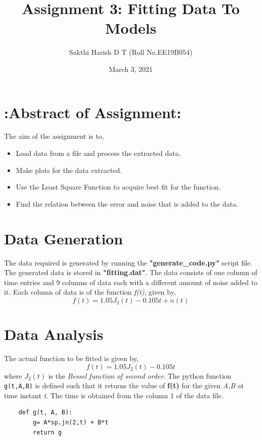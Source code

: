 \documentclass[11pt, a4paper]{article}
\title{Assignment 3: Fitting Data To Models}
\author{Sakthi Harish D T (Roll No.EE19B054)}
\date{March 3, 2021}
\begin{document}

\section*{\hspace{30 mm}:Abstract of Assignment:}
The aim of the assignment is to,
\begin{itemize}
    \item Load data from a file and process the extracted data.
    \item Make plots for the data extracted.
    \item Use the Least Square Function to acquire best fit for the function.
    \item Find the relation between the error and noise that is added to the data.
\end{itemize}

\section{Data Generation}
The data required is generated by running the \textbf{"generate\_code.py"} script file. The generated data is stored in \textbf{"fitting.dat"}. The data consists of one column of time entries and 9 columns of data each with a different amount of noise added to it. Each column of data is of the function \textit{f(t)}, given by,
\begin{equation}\label{eq:1}
f(t) = 1.05J_{2}(t) - 0.105t + n(t)
\end{equation}
\section{Data Analysis}
The actual function to be fitted is given by,
\begin{equation}\label{eq:2}
f(t) = 1.05J_{2}(t) - 0.105t
\end{equation}
where \textbf{$J_2(t)$} is the \textit{Bessel function of second order}. 
The python function \texttt{g(t,A,B)} is defined such that it returns the value of \textbf{f(t)} for the given \textit{A,B} at time instant \textit{t}. 
The time is obtained from the column 1 of the data file.\\
\begin{verbatim}
    def g(t, A, B):
        g= A*sp.jn(2,t) + B*t
        return g
\end{verbatim}
\end{document}
